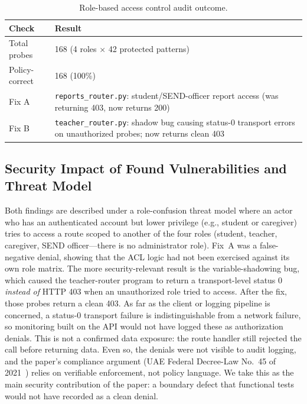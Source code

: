\documentclass[conference]{IEEEtran}
\begin{document}
\begin{table}[!t]
\caption{Role-based access control audit outcome.}
\label{tab:VIII}
\centering
\small
\begin{tabular}{@{}p{2.1cm}p{5.5cm}@{}}
\toprule
\textbf{Check} & \textbf{Result} \\
\midrule
Total probes & 168 (4 roles $\times$ 42 protected patterns) \\
Policy-correct & 168 (100\%) \\
Fix A & \texttt{reports\_router.py}: student/SEND-officer report access (was returning 403, now returns 200) \\
Fix B & \texttt{teacher\_router.py}: shadow bug causing status-0 transport errors on unauthorized probes; now returns clean 403 \\
\bottomrule
\end{tabular}
\end{table}

\subsection{Security Impact of Found Vulnerabilities and Threat Model}
Both findings are described under a role-confusion threat model where an actor who has an authenticated account but lower privilege (e.g., student or caregiver) tries to access a route scoped to another of the four roles (student, teacher, caregiver, SEND officer---there is no administrator role). Fix~A was a false-negative denial, showing that the ACL logic had not been exercised against its own role matrix. The more security-relevant result is the variable-shadowing bug, which caused the teacher-router program to return a transport-level status 0 \emph{instead of} HTTP 403 when an unauthorized role tried to access. After the fix, those probes return a clean 403. As far as the client or logging pipeline is concerned, a status-0 transport failure is indistinguishable from a network failure, so monitoring built on the API would not have logged these as authorization denials. This is not a confirmed data exposure: the route handler still rejected the call before returning data. Even so, the denials were not visible to audit logging, and the paper's compliance argument (UAE Federal Decree-Law No.~45 of 2021~\cite{b14}) relies on verifiable enforcement, not policy language. We take this as the main security contribution of the paper: a boundary defect that functional tests would not have recorded as a clean denial.
\end{document}
